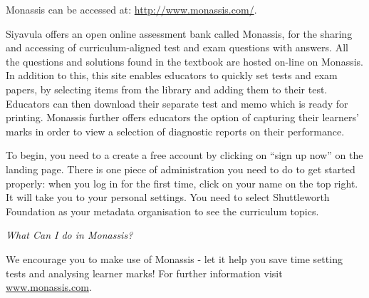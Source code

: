 {\Large
Monassis can be accessed at: \underline{http://www.monassis.com/}.\par 

Siyavula offers an open online assessment bank called Monassis, for the sharing and accessing of curriculum-aligned test and exam questions with answers. All the questions and solutions found in the textbook are hosted on-line on Monassis. In addition to this, this site enables educators to quickly set tests and exam papers, by selecting items from the library and adding them to their test. Educators can then download their separate test and memo which is ready for printing. Monassis further offers educators the option of capturing their learners' marks in order to view a selection of diagnostic reports on their performance.\par 

To begin, you need to a create a free account by clicking on “sign up now” on the landing page. There is one piece of administration you need to do to get started properly: when you log in for the first time, click on your name on the top right. It will take you to your personal settings. You need to select Shuttleworth Foundation as your metadata organisation to see the curriculum topics.\par 

{\normalfont\sffamily\fontsize{16}\normalfont\itshape What Can I do in Monassis?}\par 

\begin{figure}[H]
\begin{center}
\end{center}
\end{figure}

We encourage you to make use of Monassis - let it help you save time setting tests and analysing learner marks! For further information visit \underline{www.monassis.com}.






}
